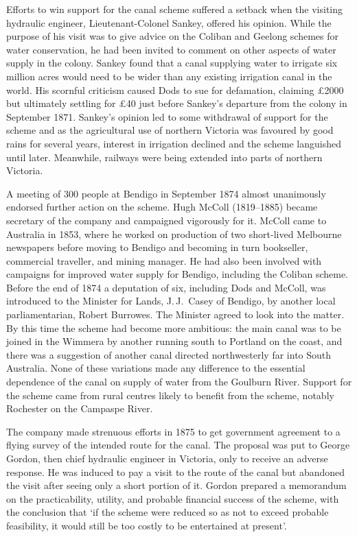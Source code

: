 Efforts to win support for the canal scheme suffered a setback when
the visiting hydraulic engineer, Lieutenant-Colonel Sankey, offered
his opinion.  While the purpose of his visit was to give advice on the
Coliban and Geelong schemes for water conservation, he had been
invited to comment on other aspects of water supply in the colony.
Sankey found that a canal supplying water to irrigate six million
acres would need to be wider than any existing irrigation canal in the
world.  His scornful criticism caused Dods to sue for defamation,
claiming \pounds2000 but ultimately settling for \pounds40 just before
Sankey's departure from the colony in September 1871. Sankey's opinion
led to some withdrawal of support for the scheme and as the
agricultural use of northern Victoria was favoured by good rains for
several years, interest in irrigation declined and the scheme
languished until later.  Meanwhile, railways were being extended into
parts of northern Victoria.

A meeting of 300 people at Bendigo in September 1874 almost
unanimously endorsed further action on the scheme.  Hugh McColl
(1819--1885) became secretary of the company and campaigned vigorously
for it.  McColl came to Australia in 1853, where he worked on
production of two short-lived Melbourne newspapers before moving to
Bendigo and becoming in turn bookseller, commercial traveller, and
mining manager.  He had also been involved with campaigns for improved
water supply for Bendigo, including the Coliban scheme.  Before the
end of 1874 a deputation of six, including Dods and McColl, was
introduced to the Minister for Lands, J.\,J.~Casey of Bendigo, by
another local parliamentarian, Robert Burrowes.  The Minister agreed
to look into the matter.  By this time the scheme had become more
ambitious: the main canal was to be joined in the Wimmera by another
running south to Portland on the coast, and there was a suggestion of
another canal directed northwesterly far into South Australia.  None
of these variations made any difference to the essential dependence of
the canal on supply of water from the Goulburn River.  Support for the
scheme came from rural centres likely to benefit from the scheme,
notably Rochester on the Campaspe River.

The company made strenuous efforts in 1875 to get government agreement
to a flying survey of the intended route for the canal.  The proposal
was put to George Gordon, then chief hydraulic engineer in Victoria,
only to receive an adverse response.  He was induced to pay a visit to
the route of the canal but abandoned the visit after seeing only a
short portion of it.  Gordon prepared a memorandum on the
practicability, utility, and probable financial success of the scheme,
with the conclusion that `if the scheme were reduced so as not to
exceed probable feasibility, it would still be too costly to be
entertained at present'.


